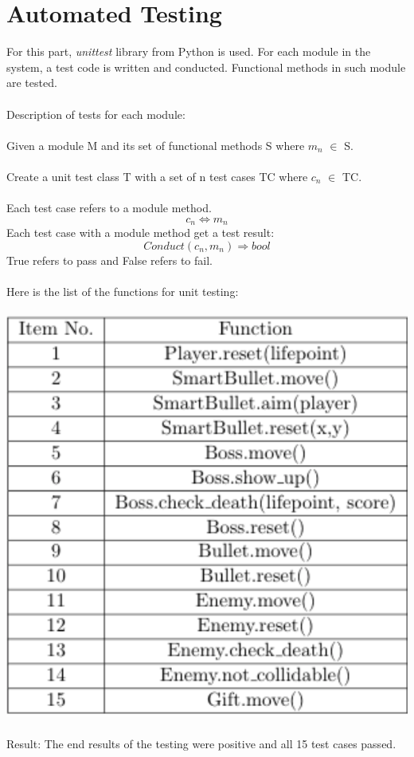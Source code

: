 \documentclass[12,english]{article}
\begin{document}
\section{Automated Testing}
For this part, \emph{unittest} library from Python is used. For each module in the system, a test code is written and conducted. Functional methods in such module are tested.\\\\
Description of tests for each module:\\\\
Given a module M and its set of functional methods S where $m_n$ $\in$ S.\\\\
Create a unit test class T with a set of n test cases TC where $c_n$ $\in$ TC.\\\\
Each test case refers to a module method.
$$c_n \Longleftrightarrow m_n$$
Each test case with a module method get a test result:
$$Conduct(c_n, m_n)\Rightarrow bool$$
True refers to pass and False refers to fail.\\\\
Here is the list of the functions for unit testing:\\\\
\includegraphics[scale=0.6]{ut.png}\\\\
Result: The end results of the testing were positive and all 15 test cases passed.
\end{document}
